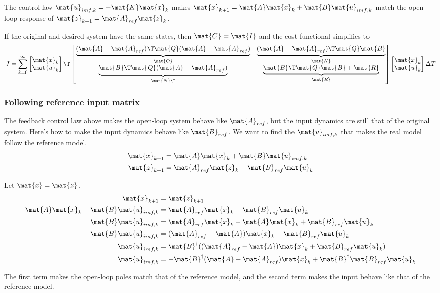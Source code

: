 The control law $\mat{u}_{imf,k} = -\mat{K}\mat{x}_k$ makes
$\mat{x}_{k+1} = \mat{A}\mat{x}_k + \mat{B}\mat{u}_{imf,k}$ match the open-loop
response of $\mat{z}_{k+1} = \mat{A}_{ref}\mat{z}_k$.

If the original and desired system have the same states, then
$\mat{C} = \mat{I}$ and the cost functional simplifies to
\begin{equation}
  J = \sum_{k=0}^\infty
  \begin{bmatrix}
    \mat{x}_k \\
    \mat{u}_k
  \end{bmatrix}\T
  \begin{bmatrix}
    \underbrace{(\mat{A} - \mat{A}_{ref})\T\mat{Q}
      (\mat{A} - \mat{A}_{ref})}_{\mat{Q}} &
    \underbrace{(\mat{A} - \mat{A}_{ref})\T\mat{Q}\mat{B}}_{\mat{N}} \\
    \underbrace{\mat{B}\T\mat{Q}(\mat{A} - \mat{A}_{ref})}_{\mat{N}\T} &
    \underbrace{\mat{B}\T\mat{Q}\mat{B} + \mat{R}}_{\mat{R}}
  \end{bmatrix}
  \begin{bmatrix}
    \mat{x}_k \\
    \mat{u}_k
  \end{bmatrix}
  \Delta T
\end{equation}

\subsubsection{Following reference input matrix}

The feedback control law above makes the open-loop system behave like
$\mat{A}_{ref}$, but the input dynamics are still that of the original system.
Here's how to make the input dynamics behave like $\mat{B}_{ref}$. We want to
find the $\mat{u}_{imf,k}$ that makes the real model follow the reference model.
\begin{align*}
  \mat{x}_{k+1} &= \mat{A}\mat{x}_k + \mat{B}\mat{u}_{imf,k} \\
  \mat{z}_{k+1} &= \mat{A}_{ref}\mat{z}_k + \mat{B}_{ref}\mat{u}_k
\end{align*}

Let $\mat{x} = \mat{z}$.
\begin{align*}
  \mat{x}_{k+1} &= \mat{z}_{k+1} \\
  \mat{A}\mat{x}_k + \mat{B}\mat{u}_{imf,k} &= \mat{A}_{ref}\mat{x}_k +
    \mat{B}_{ref}\mat{u}_k \\
  \mat{B}\mat{u}_{imf,k} &= \mat{A}_{ref}\mat{x}_k - \mat{A}\mat{x}_k +
    \mat{B}_{ref}\mat{u}_k \\
  \mat{B}\mat{u}_{imf,k} &= (\mat{A}_{ref} - \mat{A})\mat{x}_k +
    \mat{B}_{ref}\mat{u}_k \\
  \mat{u}_{imf,k} &= \mat{B}^\dagger ((\mat{A}_{ref} - \mat{A})\mat{x}_k +
    \mat{B}_{ref}\mat{u}_k) \\
  \mat{u}_{imf,k} &= -\mat{B}^\dagger (\mat{A} - \mat{A}_{ref})\mat{x}_k +
    \mat{B}^\dagger \mat{B}_{ref}\mat{u}_k
\end{align*}

The first term makes the open-loop poles match that of the reference model, and
the second term makes the input behave like that of the reference model.
